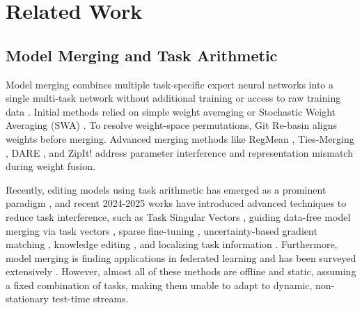 \documentclass{article}
\theoremstyle{plain}
\theoremstyle{definition}
\theoremstyle{remark}
\begin{document}
\section{Related Work}
\label{sec:related}

\subsection{Model Merging and Task Arithmetic}
Model merging combines multiple task-specific expert neural networks into a single multi-task network without additional training or access to raw training data \cite{wortsman202ModelSoups, matena2022merging}. Initial methods relied on simple weight averaging or Stochastic Weight Averaging (SWA) \cite{izmailov2018averaging}. To resolve weight-space permutations, Git Re-basin \cite{ainsworth2023git} aligns weights before merging. Advanced merging methods like RegMean \cite{jin2023regmean}, Ties-Merging \cite{yadav2023ties}, DARE \cite{yu2023dare}, and ZipIt! \cite{stoica2024zipit} address parameter interference and representation mismatch during weight fusion. 

Recently, editing models using task arithmetic has emerged as a prominent paradigm \cite{ilharco2023editing}, and recent 2024-2025 works have introduced advanced techniques to reduce task interference, such as Task Singular Vectors \cite{gargiulo2025task}, guiding data-free model merging via task vectors \cite{cheng2025whoever}, sparse fine-tuning \cite{iurada2025efficient}, uncertainty-based gradient matching \cite{daheim2024model_gradient}, knowledge editing \cite{fu2025model}, and localizing task information \cite{wang2024localizing}. Furthermore, model merging is finding applications in federated learning \cite{morafah2024towards} and has been surveyed extensively \cite{yang2024model_survey}. However, almost all of these methods are offline and static, assuming a fixed combination of tasks, making them unable to adapt to dynamic, non-stationary test-time streams.
\end{document}
